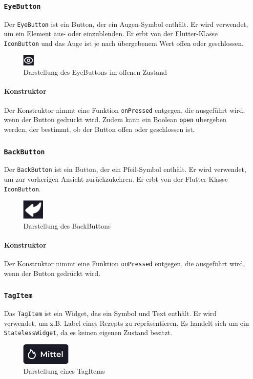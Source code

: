 \documentclass{entwurfsheft}
\begin{document}
\begin{sloppypar}
\subsubsection{\texttt{EyeButton}}
\label{sec:eyeButton}
Der \texttt{EyeButton} ist ein Button, der ein Augen-Symbol enthält. Er wird verwendet, um ein Element aus- oder einzublenden. Er erbt von der Flutter-Klasse \texttt{IconButton} und das Auge ist je nach übergebenem Wert offen oder geschlossen.
\begin{figure}[htp]
    \centering
    \includegraphics[height = .5cm]{images/presentationLayer/uiElements/eyeButton.png}
    \caption{Darstellung des EyeButtons im offenen Zustand}
\end{figure}
\paragraph*{Konstruktor}
Der Konstruktor nimmt eine Funktion \texttt{onPressed} entgegen, die ausgeführt wird, wenn der Button gedrückt wird. Zudem kann ein Boolean \texttt{open} übergeben werden, der bestimmt, ob der Button offen oder geschlossen ist.
\newpage

\subsubsection{\texttt{BackButton}}
\label{sec:backButton}
Der \texttt{BackButton} ist ein Button, der ein Pfeil-Symbol enthält. Er wird verwendet, um zur vorherigen Ansicht zurückzukehren. Er erbt von der Flutter-Klasse \texttt{IconButton}.
\begin{figure}[htp]
    \centering
    \includegraphics[height = 1cm]{images/presentationLayer/uiElements/backButton.png}
    \caption{Darstellung des BackButtons}
\end{figure}
\paragraph*{Konstruktor}
Der Konstruktor nimmt eine Funktion \texttt{onPressed} entgegen, die ausgeführt wird, wenn der Button gedrückt wird.

\subsubsection{\texttt{TagItem}}
\label{sec:tagItem}
Das \texttt{TagItem} ist ein Widget, das ein Symbol und Text enthält. Er wird verwendet, um z.B. Label eines Rezepts zu repräsentieren. Es handelt sich um ein \texttt{StatelessWidget}, da es keinen eigenen Zustand besitzt.
\begin{figure}[htp]
    \centering
    \includegraphics[height = .7cm]{images/presentationLayer/uiElements/tagItem.png}
    \caption{Darstellung eines TagItems}
\end{figure}

\end{sloppypar}
\end{document}
